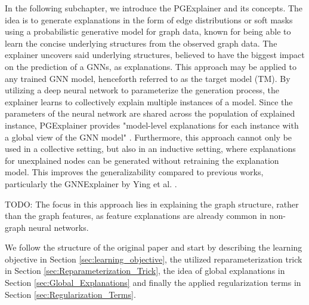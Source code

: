 In the following subchapter, we introduce the PGExplainer \cite{luo2020parameterized} and its concepts. The idea is to generate explanations in the form of edge distributions or soft masks using a probabilistic generative model for graph data, known for being able to learn the concise underlying structures from the observed graph data. The explainer uncovers said underlying structures, believed to have the biggest impact on the prediction of a GNNs, as explanations. This approach may be applied to any trained GNN model, henceforth referred to as the target model (TM). 
By utilizing a deep neural network to parameterize the generation process, the explainer learns to collectively explain multiple instances of a model. Since the parameters of the neural network are shared across the population of explained instance, PGExplainer provides "model-level explanations for each instance with a global view of the GNN model" \cite{luo2020parameterized}. Furthermore, this approach cannot only be used in a collective setting, but also in an inductive setting, where explanations for unexplained nodes can be generated without retraining the explanation model. This improves the generalizability compared to previous works, particularly the GNNExplainer by Ying et al. \cite{ying2019gnnexplainer}.


TODO: The focus in this approach lies in explaining the graph structure, rather than the graph features, as feature explanations are already common in non-graph neural networks. \bigskip

We follow the structure of the original paper \cite{luo2020parameterized} and start by describing the learning objective in Section \ref{sec:learning_objective}, the utilized reparameterization trick in Section \ref{sec:Reparameterization_Trick}, the idea of global explanations in Section \ref{sec:Global_Explanations} and finally the applied regularization terms in Section \ref{sec:Regularization_Terms}.

